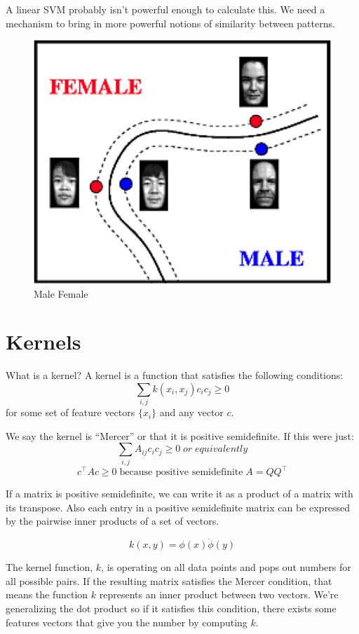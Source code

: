 \documentclass[a4paper]{article}
\begin{document}
A linear SVM probably isn't powerful enough to calculate this.  We need a mechanism to bring in more powerful notions of similarity between patterns.

\begin{figure}
\centering
\includegraphics[width=1.0\textwidth]{male_female.png}
\caption{\label{fig:svm4}Male Female}
\end{figure}

\section{Kernels}

What is a kernel? A kernel is a function that satisfies the following conditions:
$$
\sum_{i,j} k(x_i, x_j) c_i c_j \geq 0
$$
for some set of feature vectors $\{x_i\}$ and any vector $c$.

We say the kernel is ``Mercer'' or that it is positive semidefinite. If this were just:
$$
\sum_{i,j} A_{ij} c_i c_j \geq 0 \; or \; equivalently
$$
$$
c^\top A c \geq 0 \; \text{because positive semidefinite} \; A = QQ^\top
$$

If a matrix is positive semidefinite, we can write it as a product of a matrix with its transpose.  Also each entry in a positive semidefinite matrix can be expressed by the pairwise inner products of a set of vectors.

$$
k(x,y) = \phi(x) \dot \phi(y)
$$

The kernel function, $k$, is operating on all data points and pops out numbers for all possible pairs.  If the resulting matrix satisfies the Mercer condition, that means the function $k$ represents an inner product between two vectors. We're generalizing the dot product so if it satisfies this condition, there exists some features vectors that give you the number by computing $k$.  
\end{document}
